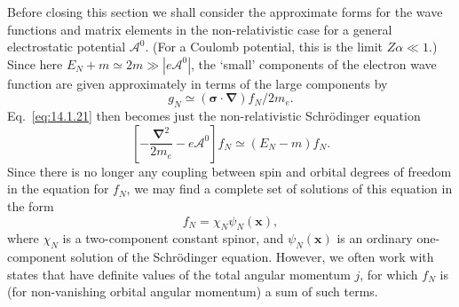 Before closing this section we shall consider the approximate forms for the
wave functions and matrix elements in the non-relativistic case for a general
electrostatic potential $\mathcal A^0$. (For a Coulomb potential, this is the
limit $Z\alpha\ll1$.) Since here $E_N+m\simeq2m\gg|e\mathcal A^0|$, the
`small' components of the electron wave function are given approximately in
terms of the large components by
\begin{equation}
  g_N\simeq(\boldsymbol\sigma\cdot\boldsymbol\nabla)f_N/2m_e.
  \tag{14.1.35}\label{eq:14.1.35}
\end{equation}
Eq.~\eqref{eq:14.1.21} then becomes just the non-relativistic Schr\"odinger
equation
\begin{equation}
  \left[-\frac{\boldsymbol\nabla^2}{2m_e}-e\mathcal A^0\right]f_N
  \simeq(E_N-m)f_N.
  \tag{14.1.36}\label{eq:14.1.36}
\end{equation}
Since there is no longer any coupling between spin and orbital degrees of
freedom in the equation for $f_N$, we may find a complete set of solutions of
this equation in the form
\[
  f_N=\chi_N\psi_N(\mathbf x),
\]
where $\chi_N$ is a two-component constant spinor, and $\psi_N(\mathbf x)$ is
an ordinary one-component solution of the Schr\"odinger equation. However, we
often work with states that have definite values of the total angular momentum
$j$, for which $f_N$ is (for non-vanishing orbital angular momentum) a sum of
such terms.

